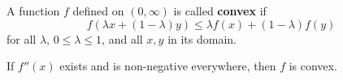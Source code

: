 A function $f$ defined on $(0, \infty)$ is called \textbf{convex} if
$$f(\lambda x + (1 - \lambda)y) \leq \lambda f(x) + (1 - \lambda)f(y)$$
for all $\lambda$, $0 \leq \lambda \leq 1$, and all $x, y$ in its domain.

If $f''(x)$ exists and is non-negative everywhere, then $f$ is convex.
